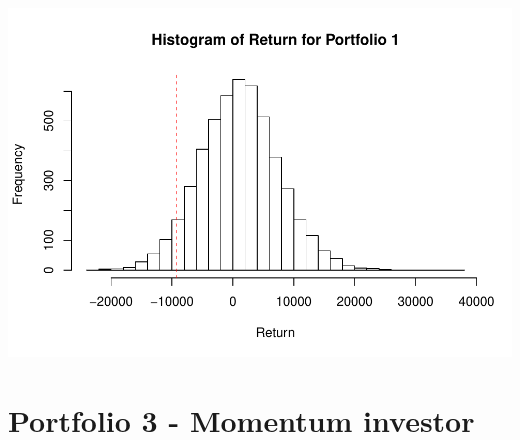 \documentclass[]{article}
\begin{document}
\includegraphics{STA380_exercise_George_files/figure-latex/unnamed-chunk-16-1.pdf}

\hypertarget{portfolio-3---momentum-investor}{%
\section{Portfolio 3 - Momentum
investor}\label{portfolio-3---momentum-investor}}
\end{document}

